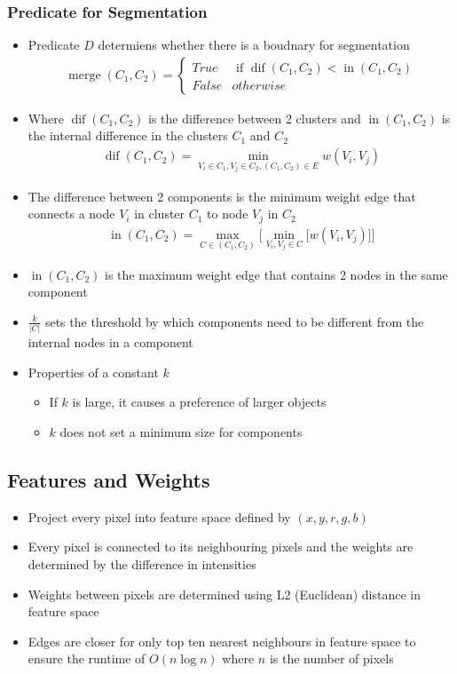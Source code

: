\documentclass[letterpaper,12pt]{article}
\newcommand{\abs}[1]{\lvert#1\rvert}
\DeclareMathOperator{\merge}{merge}
\DeclareMathOperator{\dif}{dif}
\DeclareMathOperator{\ini}{in}
\begin{document}
\subsubsection{Predicate for Segmentation}
\begin{itemize}
 \item Predicate $D$ determiens whether there is a boudnary for segmentation
       \begin{align}
        \merge(C_1, C_2) = \begin{cases}
         True  & \text{ if } \dif(C_1, C_2) < \ini(C_1, C_2) \\
         False & otherwise
        \end{cases}
       \end{align}
 \item Where $\dif(C_1, C_2)$ is the difference between 2 clusters and $\ini(C_1,C_2)$ is the internal difference in the clusters $C_1$ and $C_2$
       \begin{align}
        \dif(C_1, C_2) = \min_{V_i \in C_1, V_j \in C_2, (C_1, C_2) \in E} w(V_i, V_j)
       \end{align}
 \item The difference between 2 components is the minimum weight edge that connects a node $V_i$ in cluster $C_1$ to node $V_j$ in $C_2$
       \begin{align}
        \ini(C_1,C_2) = \max_{C \in (C_1, C_2)} \bigg[ \min_{V_i,V_j \in C}\bigg[ w(V_i, V_j) \bigg] \bigg]
       \end{align}
 \item $\ini(C_1, C_2)$ is the maximum weight edge that contains 2 nodes in the same component
 \item $\frac{k}{\abs{C}}$ sets the threshold by which components need to be different from the internal nodes in a component
 \item Properties of a constant $k$
       \begin{itemize}
        \item If $k$ is large, it causes a preference of larger objects
        \item $k$ does not set a minimum size for components
       \end{itemize}
\end{itemize}

\subsection{Features and Weights}
\begin{itemize}
 \item Project every pixel into feature space defined by $(x,y,r,g,b)$
 \item Every pixel is connected to its neighbouring pixels and the weights are determined by the difference in intensities
 \item Weights between pixels are determined using L2 (Euclidean) distance in feature space
 \item Edges are closer for only top ten nearest neighbours in feature space to ensure the runtime of $O(n \log n)$ where $n$ is the number of pixels
\end{itemize}
\end{document}

